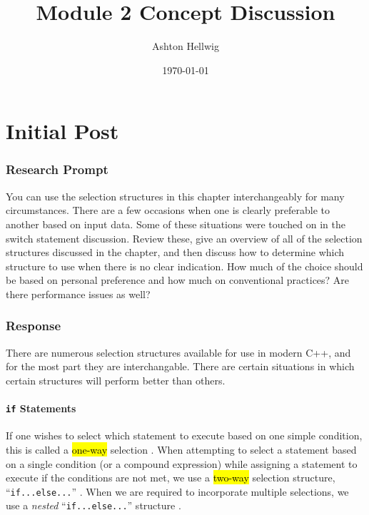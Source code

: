 \documentclass[12pt]{report}
\title{Module 2 Concept Discussion}
\author{Ashton Hellwig}
\date{\today}
\newcommand{\CiteSection}[2]{%
    \parencite[~\S {#2}]{#1}
  }
\theoremstyle{definition}
\theoremstyle{plain}
\theoremstyle{plain}
\begin{document}
  \maketitle
  \tableofcontents
  \newpage


  \part{Initial Post}

    \section{Research Prompt}
      \begin{mdframed}[backgroundcolor=green!20]
        You can use the selection structures in this chapter interchangeably
          for many circumstances. There are a few occasions when one is clearly
          preferable to another based on input data. Some of these situations
          were touched on in the switch statement discussion. Review these, give
          an overview of all of the selection structures discussed in the
          chapter, and then discuss how to determine which structure to use when
          there is no clear indication. How much of the choice should be based
          on personal preference and how much on conventional practices? Are
          there performance issues as well?
      \end{mdframed}

    \section{Response}
      There are numerous selection structures available for use in modern C++,
        and for the most part they are interchangable. There are certain
        situations in which certain structures will perform better than others.

      \subsection{\texttt{if} Statements}
        If one wishes to select which statement to execute based on one simple
          condition, this is called a \hl{one-way} selection
          \CiteSection{malik_2015}{4-1d}. When attempting to select a statement
          based on a single condition (or a compound expression) while assigning
          a statement to execute if the conditions are not met, we use a
          \hl{two-way} selection structure, ``\texttt{if...else...}''
          \CiteSection{malik_2015}{4-1e}. When we are required to incorporate
          multiple selections, we use a \textit{nested}
          ``\texttt{if...else...}'' structure \CiteSection{malik_2015}{4-1l}.
\end{document}
